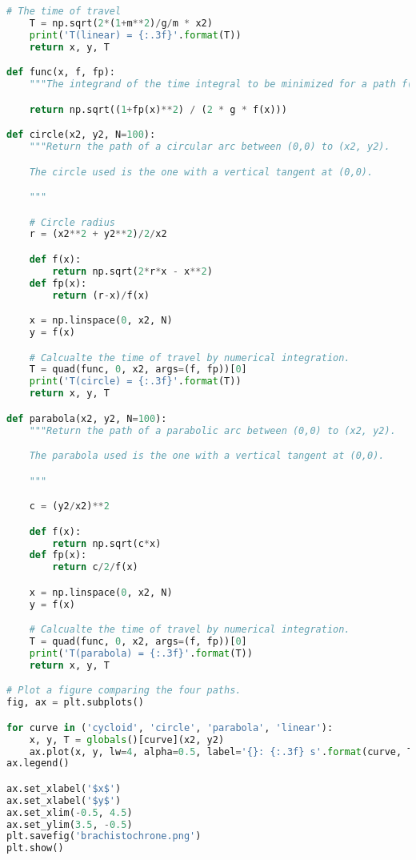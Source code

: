 \begin{lstlisting}[language=Python, caption=\textit{Python Script for the Brachistochrone system}]
    # The time of travel
    T = np.sqrt(2*(1+m**2)/g/m * x2)
    print('T(linear) = {:.3f}'.format(T))
    return x, y, T

def func(x, f, fp):
    """The integrand of the time integral to be minimized for a path f(x)."""

    return np.sqrt((1+fp(x)**2) / (2 * g * f(x)))

def circle(x2, y2, N=100):
    """Return the path of a circular arc between (0,0) to (x2, y2).

    The circle used is the one with a vertical tangent at (0,0).

    """

    # Circle radius
    r = (x2**2 + y2**2)/2/x2

    def f(x):
        return np.sqrt(2*r*x - x**2)
    def fp(x):
        return (r-x)/f(x)

    x = np.linspace(0, x2, N)
    y = f(x)

    # Calcualte the time of travel by numerical integration.
    T = quad(func, 0, x2, args=(f, fp))[0]
    print('T(circle) = {:.3f}'.format(T))
    return x, y, T

def parabola(x2, y2, N=100):
    """Return the path of a parabolic arc between (0,0) to (x2, y2).

    The parabola used is the one with a vertical tangent at (0,0).

    """

    c = (y2/x2)**2

    def f(x):
        return np.sqrt(c*x)
    def fp(x):
        return c/2/f(x)

    x = np.linspace(0, x2, N)
    y = f(x)

    # Calcualte the time of travel by numerical integration.
    T = quad(func, 0, x2, args=(f, fp))[0]
    print('T(parabola) = {:.3f}'.format(T))
    return x, y, T

# Plot a figure comparing the four paths.
fig, ax = plt.subplots()

for curve in ('cycloid', 'circle', 'parabola', 'linear'):
    x, y, T = globals()[curve](x2, y2)
    ax.plot(x, y, lw=4, alpha=0.5, label='{}: {:.3f} s'.format(curve, T))
ax.legend()

ax.set_xlabel('$x$')
ax.set_xlabel('$y$')
ax.set_xlim(-0.5, 4.5)
ax.set_ylim(3.5, -0.5)
plt.savefig('brachistochrone.png')
plt.show()

\end{lstlisting}
        

